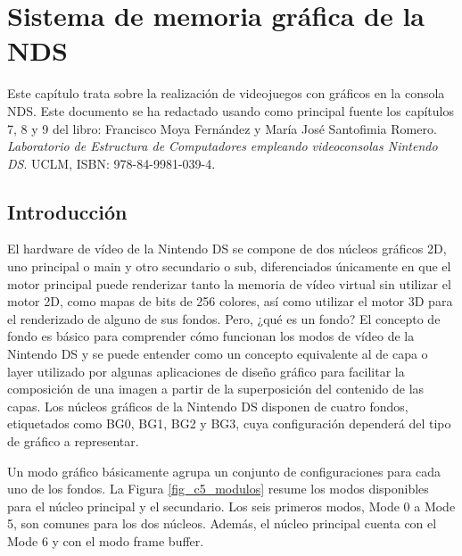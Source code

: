 \chapter{Sistema de memoria gráfica de la NDS}

Este capítulo trata sobre la realización de videojuegos con gráficos en la consola NDS. Este documento se ha redactado usando como principal fuente los capítulos 7, 8 y 9 del libro: Francisco Moya Fernández y María José Santofimia Romero. \textit{Laboratorio de Estructura de Computadores empleando videoconsolas Nintendo DS}. UCLM, ISBN: 978-84-9981-039-4.

\section{Introducción}
El hardware de vídeo de la Nintendo DS se compone de dos núcleos gráficos 2D, uno principal o main y otro secundario o sub, diferenciados únicamente en que el motor principal puede renderizar tanto la memoria de vídeo virtual sin utilizar el motor 2D, como mapas de bits de 256 colores, así como utilizar el motor 3D para el renderizado de alguno de sus fondos. Pero, ¿qué es un fondo? El concepto de fondo es básico para comprender cómo funcionan los modos de vídeo de la Nintendo DS y se puede entender como un concepto equivalente al de capa o layer utilizado por algunas aplicaciones de diseño gráfico para facilitar la composición de una imagen a partir de la superposición del contenido de las capas. Los núcleos gráficos de la Nintendo DS disponen de cuatro fondos, etiquetados como BG0, BG1, BG2 y BG3, cuya configuración dependerá del tipo de gráfico a representar.

Un modo gráfico básicamente agrupa un conjunto de configuraciones para cada uno de los fondos. La Figura \ref{fig_c5_modulos} resume los modos disponibles para el núcleo principal y el secundario. Los seis primeros modos, Mode 0 a Mode 5, son comunes para los dos núcleos. Además, el núcleo principal cuenta con el Mode 6 y con el modo frame buffer.

